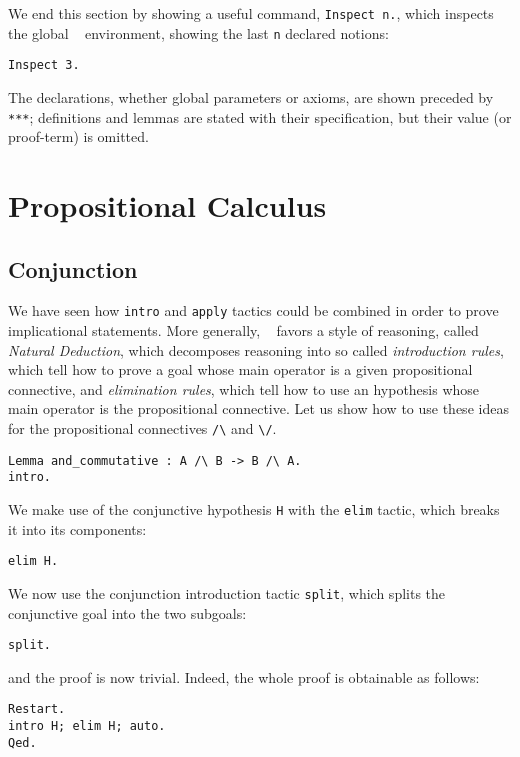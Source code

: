 \documentclass{book}
\begin{document}
We end this section by showing a useful command, \verb:Inspect n.:,
which inspects the global \Coq~ environment, showing the last \verb:n: declared
notions: 
\begin{lstlisting}
Inspect 3.
\end{lstlisting}

The declarations, whether global parameters or axioms, are shown preceded by 
\verb:***:; definitions and lemmas are stated with their specification, but
their value (or proof-term) is omitted.

\section{Propositional Calculus}

\subsection{Conjunction}

We have seen how \verb:intro: and \verb:apply: tactics could be combined
in order to prove implicational statements. More generally, \Coq~ favors a style
of reasoning, called {\sl Natural Deduction}, which decomposes reasoning into 
so called {\sl introduction rules}, which tell how to prove a goal whose main 
operator is a given propositional connective, and {\sl elimination rules},
which tell how to use an hypothesis whose main operator is the propositional 
connective. Let us show how to use these ideas for the propositional connectives
\verb:/\: and \verb:\/:.

\begin{lstlisting}
Lemma and_commutative : A /\ B -> B /\ A.
intro.
\end{lstlisting}

We make use of the conjunctive hypothesis \verb:H: with the \verb:elim: tactic,
which breaks it into its components:
\begin{lstlisting}
elim H.
\end{lstlisting}

We now use the conjunction introduction tactic \verb:split:, which splits the 
conjunctive goal into the two subgoals:
\begin{lstlisting}
split.
\end{lstlisting}

and the proof is now trivial. Indeed, the whole proof is obtainable as follows:
\begin{lstlisting}
Restart.
intro H; elim H; auto.
Qed.
\end{lstlisting}
\end{document}
